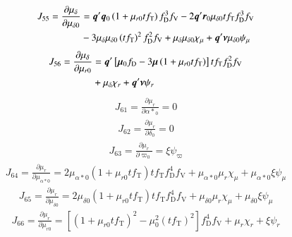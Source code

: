 \documentclass{aa}
\def\vec#1{\ensuremath{\mathchoice{\mbox{\boldmath$\displaystyle#1$}}
{\mbox{\boldmath$\textstyle#1$}}
{\mbox{\boldmath$\scriptstyle#1$}}
{\mbox{\boldmath$\scriptscriptstyle#1$}}}}
\begin{document}
\begin{equation*}
 \begin{aligned}
    J_{55}=\frac{\partial\mu_\delta}{\partial\mu_{\delta0}} &=
    \vec{q}'\vec{q}_0\left(1+\mu_{r0}tf_\mathrm{T}\right)f_\mathrm{D}^3f_\mathrm{V}
    -2\vec{q}'\vec{r}_0\mu_{\delta0}tf_\mathrm{T}f_\mathrm{D}^3f_\mathrm{V}\\
    &-3\mu_\delta\mu_{\delta0}\left(tf_\mathrm{T}\right)^2f_\mathrm{D}^2f_\mathrm{V}
    +\mu_{\delta}\mu_{\delta0}\chi_\mu
    +\vec{q}'\vec{\nu}\mu_{\delta0}\psi_\mu
 \end{aligned}
\end{equation*}
\begin{equation*}
 \begin{aligned}
    J_{56}=\frac{\partial\mu_\delta}{\partial\mu_{r0}}&=
    \vec{q}'\left[\vec{\mu}_0f_\mathrm{D}-3\vec{\mu}\left(1+\mu_{r0}tf_\mathrm{T}\right)\right]
    tf_\mathrm{T}f_\mathrm{D}^2f_\mathrm{V}\\
    &+\mu_{\delta}\chi_r
    +\vec{q}'\vec{\nu}\psi_r
 \end{aligned}
\end{equation*}
\begin{equation*}
 \begin{aligned}
    J_{61}=\frac{\partial\mu_r}{\partial{\alpha*}_0}=0
 \end{aligned}
\end{equation*}
\begin{equation*}
 \begin{aligned}
    J_{62}=\frac{\partial\mu_r}{\partial\delta_0}=0
 \end{aligned}
\end{equation*}
\begin{equation*}
 \begin{aligned}
    J_{63}=\frac{\partial\mu_r}{\partial\varpi_0}=\xi\psi_\varpi
 \end{aligned}
\end{equation*}
\begin{equation*}
 \begin{aligned}
    J_{64}=\frac{\partial\mu_r}{\partial\mu_{\alpha*0}}=
    2\mu_{\alpha*0}\left(1+\mu_{r0}tf_\mathrm{T}\right)tf_\mathrm{T}f_\mathrm{D}^4f_\mathrm{V}
    +\mu_{\alpha*0}\mu_r\chi_\mu
    +\mu_{\alpha*0}\xi\psi_\mu
 \end{aligned}
\end{equation*}
\begin{equation*}
 \begin{aligned}
    J_{65}=\frac{\partial\mu_r}{\partial\mu_{\delta0}}=
    2\mu_{\delta0}\left(1+\mu_{r0}tf_\mathrm{T}\right)tf_\mathrm{T}f_\mathrm{D}^4f_\mathrm{V}
    +\mu_{\delta0}\mu_r\chi_\mu
    +\mu_{\delta0}\xi\psi_\mu
 \end{aligned}
\end{equation*}
\begin{equation*}
 \begin{aligned}
    J_{66}=\frac{\partial\mu_r}{\partial\mu_{r0}}=
    \left[\left(1+\mu_{r0}tf_\mathrm{T}\right)^2-\mu_0^2\left(tf_\mathrm{T}\right)^2\right]
    f_\mathrm{D}^4f_\mathrm{V}
    +\mu_r\chi_r
    +\xi\psi_r
 \end{aligned}
\end{equation*}
\end{document}
